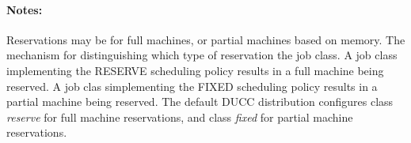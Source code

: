     \paragraph{Notes:}
    Reservations may be for full machines, or partial machines based on memory. The mechanism for
    distinguishing which type of reservation the job class. A job class implementing the RESERVE
    scheduling policy results in a full machine being reserved. A job clas simplementing the FIXED
    scheduling policy results in a partial machine being reserved. The default DUCC distribution
    configures class {\em reserve} for full machine reservations, and class {\em fixed} for partial
    machine reservations.


